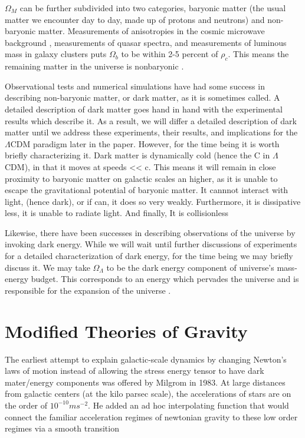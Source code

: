 \documentclass[12pt]{article}
\begin{document}
$\Omega_{M}$ can be further subdivided into two categories, baryonic matter (the usual matter we encounter day to day, made up of protons and neutrons) and non-baryonic matter. Measurements of anisotropies in the cosmic microwave background , measurements of quasar spectra, and measurements of luminous mass in galaxy clusters puts $\Omega_{b}$ to be within 2-5 percent of $\rho_{c}$. This means the remaining matter in the universe is nonbaryonic \cite{scott2002}.

Observational tests and numerical simulations have had some success in describing non-baryonic matter, or dark matter, as it is sometimes called. A detailed description of dark matter goes hand in hand with the experimental results which describe it. As a result, we will differ a detailed description of dark matter until we address these experiments, their results, and implications for the $\Lambda$CDM paradigm later in the paper. However, for the time being it is worth briefly characterizing it. Dark matter is dynamically cold (hence the C in $\Lambda$CDM), in that it moves at speeds <{}< c. This means it will remain in close proximity to baryonic matter on galactic scales an higher, as it is unable to escape the gravitational potential of baryonic matter. It cannnot interact with light, (hence dark), or if can, it does so very weakly. Furthermore, it is dissipative less, it is unable to radiate light. And finally, It is collisionless \cite{Famaey2012}

Likewise, there have been successes in describing observations of the universe by invoking dark energy. While we will wait until further discussions of experiments for a detailed characterization of dark energy, for the time being we may briefly discuss it. We may take $\Omega_{\Lambda}$ to be the dark energy component of universe's mass-energy budget. This corresponds to an energy which pervades the universe and is responsible for the expansion of the universe  \cite{scott2002}.

\section{Modified Theories of Gravity}

The earliest attempt to explain galactic-scale dynamics by changing Newton's laws of motion instead of allowing the stress energy tensor to have dark mater/energy components was offered by Milgrom in 1983. At large distances from galactic centers (at the kilo parsec scale), the accelerations of stars are on the order of $10^{-10}ms^{-2}$. He added an ad hoc interpolating function that would connect the familiar acceleration regimes of newtonian gravity to these low order regimes via a smooth transition \cite{MilgromI1983}
\end{document}
